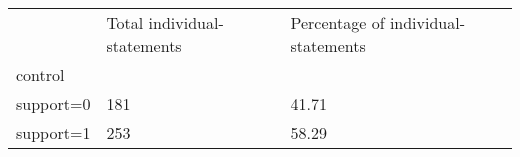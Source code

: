 \documentclass{article}
\begin{document}
\begin{table}[!h]
\centering
\begin{tabular}{lll}
\cline{1-3}
\multicolumn{1}{|l}{} &
  \multicolumn{1}{|l}{Total individual-statements} &
  \multicolumn{1}{|l|}{Percentage of individual-statements} \\
\cline{1-3}
\multicolumn{1}{|l}{control} &
  \multicolumn{1}{|l}{} &
  \multicolumn{1}{|l|}{} \\
\cline{1-3}
\multicolumn{1}{|l}{support=0} &
  \multicolumn{1}{|l}{181} &
  \multicolumn{1}{|l|}{41.71} \\
\cline{1-3}
\multicolumn{1}{|l}{support=1} &
  \multicolumn{1}{|l}{253} &
  \multicolumn{1}{|l|}{58.29} \\
\cline{1-3}
\end{tabular}
\end{table}
\end{document}
